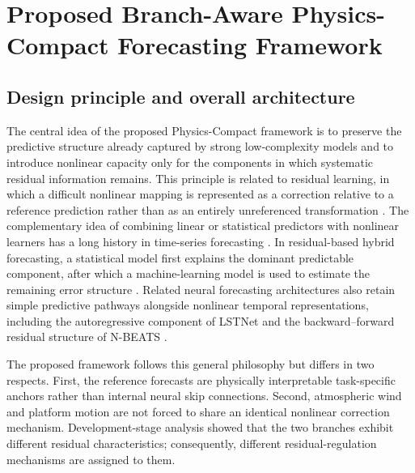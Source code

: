 
\section{Proposed Branch-Aware Physics-Compact Forecasting Framework}
\label{sec:method}

\subsection{Design principle and overall architecture}
\label{subsec:overall_architecture}

The central idea of the proposed Physics-Compact framework is to preserve the predictive structure already captured by strong low-complexity models and to introduce nonlinear capacity only for the components in which systematic residual information remains. This principle is related to residual learning, in which a difficult nonlinear mapping is represented as a correction relative to a reference prediction rather than as an entirely unreferenced transformation \cite{He2016DeepResidual}. The complementary idea of combining linear or statistical predictors with nonlinear learners has a long history in time-series forecasting \cite{Zhang2003HybridARIMAANN,KhasheiBijari2011Hybrid}. In residual-based hybrid forecasting, a statistical model first explains the dominant predictable component, after which a machine-learning model is used to estimate the remaining error structure \cite{SantosJunior2019Hybrid,SantosJunior2023Residual}. Related neural forecasting architectures also retain simple predictive pathways alongside nonlinear temporal representations, including the autoregressive component of LSTNet \cite{Lai2018LSTNet} and the backward--forward residual structure of N-BEATS \cite{Oreshkin2020NBEATS}.

The proposed framework follows this general philosophy but differs in two respects. First, the reference forecasts are physically interpretable task-specific anchors rather than internal neural skip connections. Second, atmospheric wind and platform motion are not forced to share an identical nonlinear correction mechanism. Development-stage analysis showed that the two branches exhibit different residual characteristics; consequently, different residual-regulation mechanisms are assigned to them.

